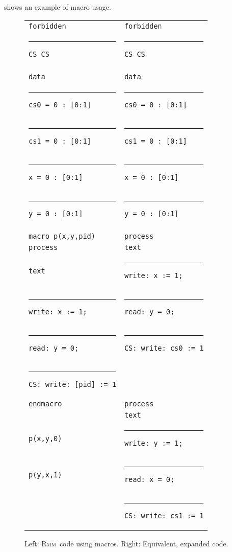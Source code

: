\documentclass[a4paper]{article}
\newcommand{\rmm}{\textsc{Rmm}}
\begin{document}
 shows an example of macro usage.

\begin{figure}
  \begin{center}
    \begin{tabular}{l|l}
      {\tt forbidden}                            & {\tt forbidden}\\
      \rule{5pt}{0pt}{\tt CS CS}                 & \rule{5pt}{0pt}{\tt CS CS}\\
      \\
      {\tt data}                                       & {\tt data}\\
      \rule{5pt}{0pt}{\tt cs0 = 0 : [0:1]}             & \rule{5pt}{0pt}{\tt cs0 = 0 : [0:1]}\\
      \rule{5pt}{0pt}{\tt cs1 = 0 : [0:1]}             & \rule{5pt}{0pt}{\tt cs1 = 0 : [0:1]}\\
      \rule{5pt}{0pt}{\tt x = 0 \hphantom{s1}: [0:1]}  & \rule{5pt}{0pt}{\tt x = 0 \hphantom{s1}: [0:1]}\\
      \rule{5pt}{0pt}{\tt y = 0 \hphantom{s1}: [0:1]}  & \rule{5pt}{0pt}{\tt y = 0 \hphantom{s1}: [0:1]}\\
      \\
      {\tt macro p(x,y,pid)}                     & {\tt process}\\
      {\tt process}                              & {\tt text}\\
      {\tt text}                                 & \rule{5pt}{0pt}{\tt write: x := 1;}\\
      \rule{5pt}{0pt}{\tt write: x := 1;}        & \rule{5pt}{0pt}{\tt read: y = 0;}\\
      \rule{5pt}{0pt}{\tt read: y = 0;}          & \rule{5pt}{0pt}{\tt CS: write: cs0 := 1}\\
      \rule{5pt}{0pt}{\tt CS: write: [pid] := 1}\\
      {\tt endmacro}                             & {\tt process}\\
                                                 & {\tt text}\\
      {\tt p(x,y,0)}                             & \rule{5pt}{0pt}{\tt write: y := 1;}\\
      {\tt p(y,x,1)}                             & \rule{5pt}{0pt}{\tt read: x = 0;}\\
                                                 &  \rule{5pt}{0pt}{\tt CS: write: cs1 := 1}\\
    \end{tabular}
  \end{center}
  \caption{Left: \rmm\ code using macros. Right: Equivalent, expanded code.}\label{fig:macro:example}
\end{figure}
\end{document}
